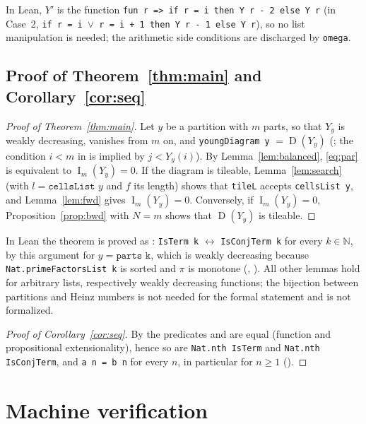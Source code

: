 \documentclass[11pt]{amsart}
\theoremstyle{plain}
\theoremstyle{definition}
\newcommand{\N}{\mathbb{N}}
\newcommand{\imb}{\operatorname{I}}
\newcommand{\sh}{\operatorname{D}}
\begin{document}
In Lean, $Y'$ is the function \texttt{fun r => if r = i then Y r - 2 else Y r} (in Case~2, \texttt{if r = i $\vee$ r = i + 1 then Y r - 1 else Y r}), so no list manipulation is needed; the arithmetic side conditions are discharged by \texttt{omega}.

\subsection{Proof of Theorem~\ref{thm:main} and Corollary~\ref{cor:seq}}

\begin{proof}[Proof of Theorem~\ref{thm:main}]
Let $y$ be a partition with $m$ parts, so that $Y_y$ is weakly decreasing, vanishes from $m$ on, and \texttt{youngDiagram y} $=\sh(Y_y)$ (; the condition $i<m$ in  is implied by $j<Y_y(i)$). By Lemma~\ref{lem:balanced}, \eqref{eq:par} is equivalent to $\imb_m(Y_y)=0$.
If the diagram is tileable, Lemma~\ref{lem:search} (with $l=\texttt{cellsList }y$ and $f$ its length) shows that \texttt{tileL} accepts \texttt{cellsList y}, and Lemma~\ref{lem:fwd} gives $\imb_m(Y_y)=0$.
Conversely, if $\imb_m(Y_y)=0$, Proposition~\ref{prop:bwd} with $N=m$ shows that $\sh(Y_y)$ is tileable.
\end{proof}

In Lean the theorem is proved as : \texttt{IsTerm k} $\leftrightarrow$ \texttt{IsConjTerm k} for every $k\in\N$, by this argument for $y=\texttt{parts k}$, which is weakly decreasing because \texttt{Nat.primeFactorsList k} is sorted and $\pi$ is monotone (, ). All other lemmas hold for arbitrary lists, respectively weakly decreasing functions; the bijection between partitions and Heinz numbers is not needed for the formal statement and is not formalized.

\begin{proof}[Proof of Corollary~\ref{cor:seq}]
By  the predicates  and  are equal (function and propositional extensionality), hence so are \texttt{Nat.nth IsTerm} and \texttt{Nat.nth IsConjTerm}, and \texttt{a n = b n} for every $n$, in particular for $n\ge1$ ().
\end{proof}

\section{Machine verification}\label{sec:lean}
\end{document}
